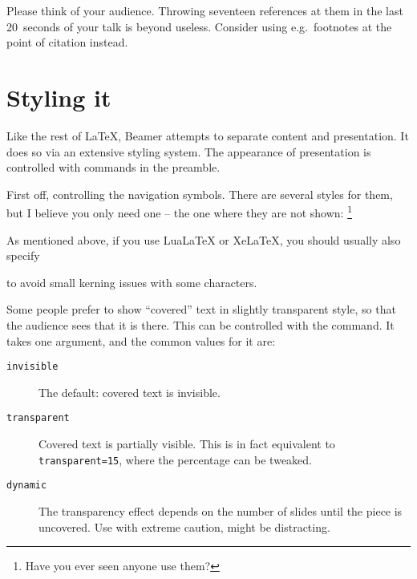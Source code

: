 \begin{practices}
Please think of your audience.
Throwing seventeen references at them in the last 20~seconds of your talk is beyond useless.
Consider using e.g.\ footnotes at the point of citation instead.
\end{practices}




%
%
%
\section{Styling it}\label{sec:beamer styles}

Like the rest of \LaTeX, Beamer attempts to separate content and presentation.
It does so via an extensive styling system.
The appearance of presentation is controlled with commands in the preamble.

First off, controlling the navigation symbols.
There are several styles for them, but I believe you only need one
-- the one where they are not shown:%
\footnote{Have you ever seen anyone use them?}
\begin{ExampleCode}
\beamertemplatenavigationsymbolsempty
\end{ExampleCode}

\begin{remark}
As mentioned above, if you use LuaLaTeX or XeLaTeX,
you should usually also specify
\begin{ExampleCode}
\end{ExampleCode}
to avoid small kerning issues with some characters.
\end{remark}


Some people prefer to show ``covered'' text in slightly transparent style,
so that the audience sees that it is there.
This can be controlled with the  command.
It takes one argument, and the common values for it are:
\begin{description}
\item[\texttt{invisible}] The default: covered text is invisible.
\item[\texttt{transparent}] Covered text is partially visible.
    This is in fact equivalent to \verb|transparent=15|, where the percentage can be tweaked.
\item[\texttt{dynamic}] The transparency effect depends on the number of slides until the piece is uncovered.
    Use with extreme caution, might be distracting.
\end{description}



